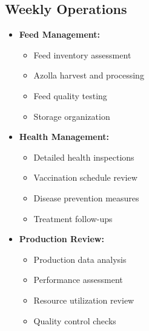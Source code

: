 \subsection{Weekly Operations}
\begin{itemize}
    \item \textbf{Feed Management:}
    \begin{itemize}
        \item Feed inventory assessment
        \item Azolla harvest and processing
        \item Feed quality testing
        \item Storage organization
    \end{itemize}
    
    \item \textbf{Health Management:}
    \begin{itemize}
        \item Detailed health inspections
        \item Vaccination schedule review
        \item Disease prevention measures
        \item Treatment follow-ups
    \end{itemize}
    
    \item \textbf{Production Review:}
    \begin{itemize}
        \item Production data analysis
        \item Performance assessment
        \item Resource utilization review
        \item Quality control checks
    \end{itemize}
\end{itemize}

